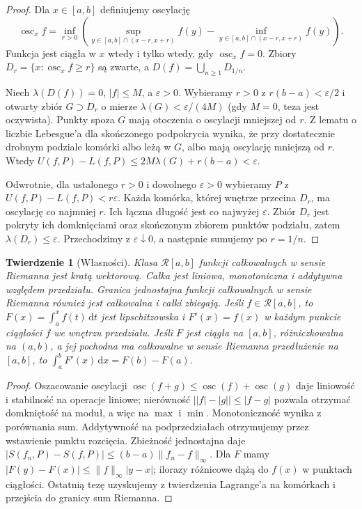 \documentclass[11pt,a4paper]{article}
\numberwithin{equation}{section}
\theoremstyle{plain}
\newtheorem{twierdzenie}{Twierdzenie}[section]
\theoremstyle{definition}
\theoremstyle{remark}
\newcommand{\osc}{\operatorname{osc}}
\begin{document}
\begin{proof}
Dla $x\in[a,b]$ definiujemy oscylację \[\osc_x f=\inf_{r>0}\left(\sup_{y\in[a,b]\cap(x-r,x+r)}f(y)-\inf_{y\in[a,b]\cap(x-r,x+r)}f(y)\right).\] Funkcja jest ciągła w $x$ wtedy i tylko wtedy, gdy $\osc_x f=0$. Zbiory $D_r=\{x:\osc_x f\ge r\}$ są zwarte, a $D(f)=\bigcup_{n\ge1}D_{1/n}$.

Niech $\lambda(D(f))=0$, $|f|\le M$, a $\varepsilon>0$. Wybieramy $r>0$ z $r(b-a)<\varepsilon/2$ i otwarty zbiór $G\supset D_r$ o mierze $\lambda(G)<\varepsilon/(4M)$ (gdy $M=0$, teza jest oczywista). Punkty spoza $G$ mają otoczenia o oscylacji mniejszej od $r$. Z lematu o liczbie Lebesgue'a dla skończonego podpokrycia wynika, że przy dostatecznie drobnym podziale komórki albo leżą w $G$, albo mają oscylację mniejszą od $r$. Wtedy $U(f,P)-L(f,P)\le2M\lambda(G)+r(b-a)<\varepsilon$.

Odwrotnie, dla ustalonego $r>0$ i dowolnego $\varepsilon>0$ wybieramy $P$ z $U(f,P)-L(f,P)<r\varepsilon$. Każda komórka, której wnętrze przecina $D_r$, ma oscylację co najmniej $r$. Ich łączna długość jest co najwyżej $\varepsilon$. Zbiór $D_r$ jest pokryty ich domknięciami oraz skończonym zbiorem punktów podziału, zatem $\lambda(D_r)\le\varepsilon$. Przechodzimy z $\varepsilon\downarrow0$, a następnie sumujemy po $r=1/n$.
\end{proof}
\begin{twierdzenie}[Własności]
Klasa $\mathcal R[a,b]$ funkcji całkowalnych w sensie Riemanna jest kratą wektorową. Całka jest liniowa, monotoniczna i addytywna względem przedziału. Granica jednostajna funkcji całkowalnych w sensie Riemanna również jest całkowalna i całki zbiegają. Jeśli $f\in\mathcal R[a,b]$, to $F(x)=\int_a^x f(t)\,\mathrm dt$ jest lipschitzowska i $F'(x)=f(x)$ w każdym punkcie ciągłości $f$ we wnętrzu przedziału. Jeśli $F$ jest ciągła na $[a,b]$, różniczkowalna na $(a,b)$, a jej pochodna ma całkowalne w sensie Riemanna przedłużenie na $[a,b]$, to $\int_a^b F'(x)\,\mathrm dx=F(b)-F(a)$.
\end{twierdzenie}
\begin{proof}
Oszacowanie oscylacji $\osc(f+g)\le\osc(f)+\osc(g)$ daje liniowość i stabilność na operacje liniowe; nierówność $\bigl||f|-|g|\bigr|\le|f-g|$ pozwala otrzymać domkniętość na moduł, a więc na $\max$ i $\min$. Monotoniczność wynika z porównania sum. Addytywność na podprzedziałach otrzymujemy przez wstawienie punktu rozcięcia. Zbieżność jednostajna daje $|S(f_n,P)-S(f,P)|\le(b-a)\|f_n-f\|_\infty$. Dla $F$ mamy $|F(y)-F(x)|\le\|f\|_\infty|y-x|$; ilorazy różnicowe dążą do $f(x)$ w punktach ciągłości. Ostatnią tezę uzyskujemy z twierdzenia Lagrange'a na komórkach i przejścia do granicy sum Riemanna.
\end{proof}
\end{document}
